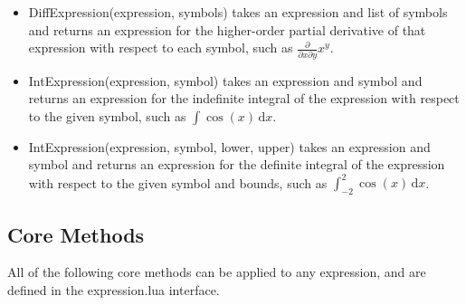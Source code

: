 \documentclass{article}
\begin{document}
\begin{itemize}
    \item {\ttfamily DiffExpression(expression, symbols)} takes an expression and list of symbols and returns an expression for the higher-order partial derivative of that expression with respect to each symbol, such as $\frac{\partial}{\partial x \partial y}x^y$.
    
    \item {\ttfamily IntExpression(expression, symbol)} takes an expression and symbol and returns an expression for the indefinite integral of the expression with respect to the given symbol, such as $\int \cos(x) \hspace{2pt} \mathrm{d}x$.
    
    \item {\ttfamily IntExpression(expression, symbol, lower, upper)} takes an expression and symbol and returns an expression for the definite integral of the expression with respect to the given symbol and bounds, such as $\int_{-2}^2 \cos(x) \hspace{2pt} \mathrm{d}x$.
\end{itemize}


\subsection{Core Methods}

All of the following core methods can be applied to any expression, and are defined in the {\ttfamily expression.lua} interface.
\end{document}

